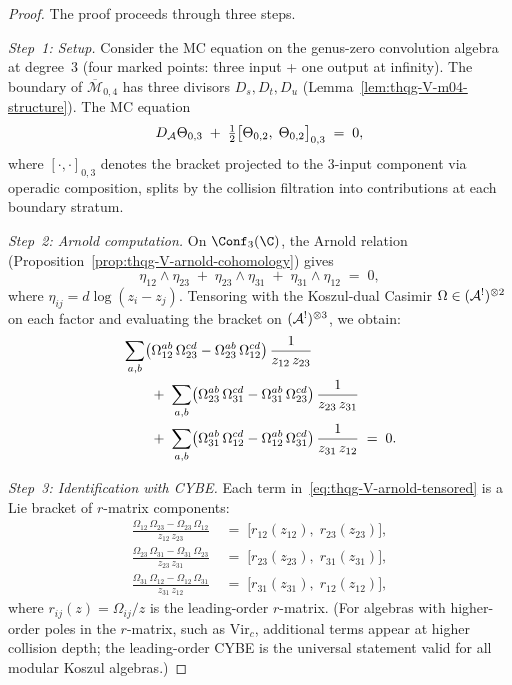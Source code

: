 \begin{proof}
The proof proceeds through three steps.

\emph{Step~1: Setup.}
Consider the MC equation on the genus-zero convolution algebra at
degree~$3$ (four marked points: three input + one output at infinity).
The boundary of $\overline{\mathcal{M}}_{0,4}$ has three divisors
$D_s, D_t, D_u$ (Lemma~\ref{lem:thqg-V-m04-structure}).
The MC equation
\begin{equation}\label{eq:thqg-V-mc-degree3}
D_{\mathcal{A}}\Theta_{0,3}
\;+\;
\tfrac{1}{2}\bigl[\Theta_{0,2},\;\Theta_{0,2}\bigr]_{0,3}
\;=\; 0,
\end{equation}
where $[\cdot,\cdot]_{0,3}$ denotes the bracket projected to the
$3$-input component via operadic composition, splits by the collision
filtration into contributions at each boundary stratum.

\emph{Step~2: Arnold computation.}
On $\Conf_3(\C)$, the Arnold relation
(Proposition~\ref{prop:thqg-V-arnold-cohomology}) gives
\begin{equation}\label{eq:thqg-V-arnold-3pt}
\eta_{12} \wedge \eta_{23}
\;+\;
\eta_{23} \wedge \eta_{31}
\;+\;
\eta_{31} \wedge \eta_{12}
\;=\; 0,
\end{equation}
where $\eta_{ij} = d\log(z_i - z_j)$.
Tensoring with the Koszul-dual Casimir
$\Omega \in (\mathcal{A}^!)^{\otimes 2}$ on each factor and evaluating
the bracket on $(\mathcal{A}^!)^{\otimes 3}$, we obtain:
\begin{align}
&\sum_{a,b} \bigl(\Omega_{12}^{ab}\,\Omega_{23}^{cd}
 - \Omega_{23}^{ab}\,\Omega_{12}^{cd}\bigr)\,
 \frac{1}{z_{12}\,z_{23}}
\notag \\
&\qquad +\;
\sum_{a,b} \bigl(\Omega_{23}^{ab}\,\Omega_{31}^{cd}
 - \Omega_{31}^{ab}\,\Omega_{23}^{cd}\bigr)\,
 \frac{1}{z_{23}\,z_{31}}
\notag \\
&\qquad +\;
\sum_{a,b} \bigl(\Omega_{31}^{ab}\,\Omega_{12}^{cd}
 - \Omega_{12}^{ab}\,\Omega_{31}^{cd}\bigr)\,
 \frac{1}{z_{31}\,z_{12}}
\;=\; 0.
\label{eq:thqg-V-arnold-tensored}
\end{align}

\emph{Step~3: Identification with CYBE.}
Each term in~\eqref{eq:thqg-V-arnold-tensored} is a Lie bracket of
$r$-matrix components:
\begin{align}
\frac{\Omega_{12}\,\Omega_{23}
 - \Omega_{23}\,\Omega_{12}}{z_{12}\,z_{23}}
&\;=\;
\bigl[r_{12}(z_{12}),\;r_{23}(z_{23})\bigr],
\label{eq:thqg-V-cybe-term1} \\
\frac{\Omega_{23}\,\Omega_{31}
 - \Omega_{31}\,\Omega_{23}}{z_{23}\,z_{31}}
&\;=\;
\bigl[r_{23}(z_{23}),\;r_{31}(z_{31})\bigr],
\label{eq:thqg-V-cybe-term2} \\
\frac{\Omega_{31}\,\Omega_{12}
 - \Omega_{12}\,\Omega_{31}}{z_{31}\,z_{12}}
&\;=\;
\bigl[r_{31}(z_{31}),\;r_{12}(z_{12})\bigr],
\label{eq:thqg-V-cybe-term3}
\end{align}
where $r_{ij}(z) = \Omega_{ij}/z$ is the leading-order $r$-matrix.
(For algebras with higher-order poles in the $r$-matrix, such as
$\mathrm{Vir}_c$, additional terms appear at higher collision depth;
the leading-order CYBE is the universal statement valid for all
modular Koszul algebras.)


\end{proof}
